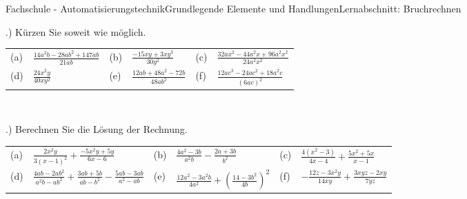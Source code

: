 \documentclass[oneside,openany,headings=optiontotoc,11pt,numbers=noenddot]{scrreprt}
\begin{document}
	\begin{worksheet}{Fachschule - Automatisierungstechnik}{Grundlegende Elemente und Handlungen}{Lernabschnitt: Bruchrechnen}
				
		\noindent
		\begin{framed}
			.) Kürzen Sie soweit wie möglich.\\
			\par\noindent
			\renewcommand{\arraystretch}{1.5}
			\begin{tabularx}{\textwidth}{lXlXlX}
				(a) & \(\frac{14a^2b - 28ab^2 + 147ab}{21ab}\) & (b) & \(\frac{-15xy + 3xy^3}{30y^2}\) & (c) & \(\frac{32ax^2 - 44a^2x + 96a^2x^2}{24a^2x^2}\)\\
				(d) & \(\frac{24x^2y}{40xy^2}\) & (e) & \(\frac{12ab + 48a^2 - 72b}{48ab^2}\) & (f) & \(\frac{12ac^3 - 24ac^2 + 18a^2c}{(6ac)^2}\)
			\end{tabularx}\\
			\par{}.) Berechnen Sie die Lösung der Rechnung.\\
			\par\noindent
			\begin{tabularx}{\textwidth}{lXlXlX}
				(a) & \(\frac{2x^2y}{3(x-1)^2} + \frac{-5x^2y + 5y}{6x-6}\) & (b) & \(\frac{4a^2 - 3b}{a^2b} - \frac{2a + 3b}{b^2}\) & (c) & \(\frac{4(x^2 - 3)}{4x - 4} + \frac{5x^2 + 5x}{x-1}\)\\
				(d) & \(\frac{4ab - 2ab^2}{a^2b - ab^2} + \frac{3ab + 5b}{ab - b^2} - \frac{5ab - 3ab}{a^2 - ab}\) & (e) & \(\frac{12a^2 - 3a^2b}{4a^2} + (\frac{14 - 3b^2}{4b})^2\) & (f) & \(-\frac{12z - 3x^2y}{14xy} + \frac{3xyz - 2xy}{7yz}\)
			\end{tabularx}\\
		\end{framed}
	\end{worksheet}
\end{document}
